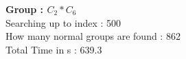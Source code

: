 \textbf{Group : $C_2*C_6$}\\
Searching up to index : 500\\
How many normal groups are found : 862\\
Total Time in s : 639.3\\

